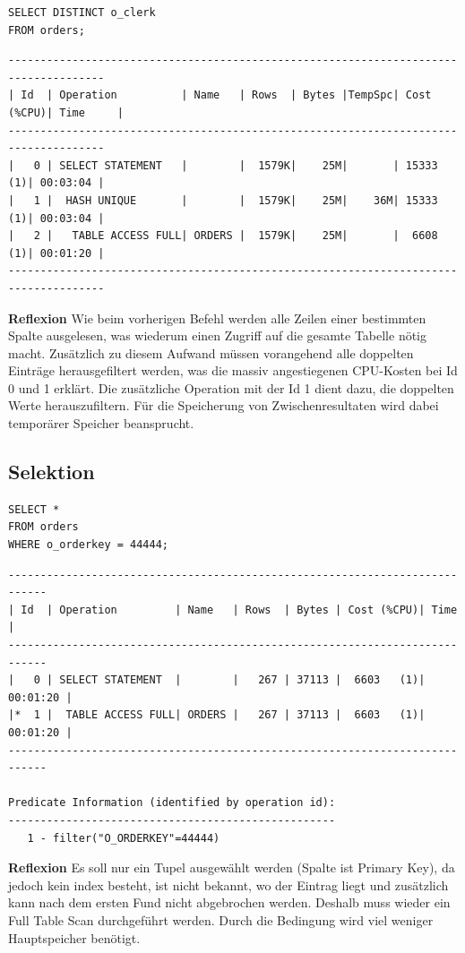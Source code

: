 \documentclass[10pt]{article}
\begin{document}
\begin{lstlisting}[style=sql]
SELECT DISTINCT o_clerk
FROM orders;
\end{lstlisting}
\begin{lstlisting}[style=queryexecutionplan]
-------------------------------------------------------------------------------------
| Id  | Operation          | Name   | Rows  | Bytes |TempSpc| Cost (%CPU)| Time     |
-------------------------------------------------------------------------------------
|   0 | SELECT STATEMENT   |        |  1579K|    25M|       | 15333   (1)| 00:03:04 |
|   1 |  HASH UNIQUE       |        |  1579K|    25M|    36M| 15333   (1)| 00:03:04 |
|   2 |   TABLE ACCESS FULL| ORDERS |  1579K|    25M|       |  6608   (1)| 00:01:20 |
-------------------------------------------------------------------------------------
\end{lstlisting} 
\textbf{Reflexion} \newline
Wie beim vorherigen Befehl werden alle Zeilen einer bestimmten Spalte ausgelesen,
was wiederum einen Zugriff auf die gesamte Tabelle nötig macht.
Zusätzlich zu diesem Aufwand müssen vorangehend alle doppelten Einträge herausgefiltert werden,
was die massiv angestiegenen CPU-Kosten bei Id 0 und 1 erklärt.
Die zusätzliche Operation mit der Id 1 dient dazu, die doppelten Werte herauszufiltern.
Für die Speicherung von Zwischenresultaten wird dabei temporärer Speicher beansprucht.

\subsection{Selektion}
\begin{lstlisting}[style=sql]
SELECT *
FROM orders
WHERE o_orderkey = 44444;
\end{lstlisting}
\begin{lstlisting}[style=queryexecutionplan]
----------------------------------------------------------------------------
| Id  | Operation         | Name   | Rows  | Bytes | Cost (%CPU)| Time     |
----------------------------------------------------------------------------
|   0 | SELECT STATEMENT  |        |   267 | 37113 |  6603   (1)| 00:01:20 |
|*  1 |  TABLE ACCESS FULL| ORDERS |   267 | 37113 |  6603   (1)| 00:01:20 |
----------------------------------------------------------------------------

Predicate Information (identified by operation id):
---------------------------------------------------
   1 - filter("O_ORDERKEY"=44444)
\end{lstlisting}
\textbf{Reflexion} \newline
Es soll nur ein Tupel ausgewählt werden (Spalte ist Primary Key), da jedoch 
kein index besteht, ist nicht bekannt, wo der Eintrag liegt und zusätzlich 
kann nach dem ersten Fund nicht abgebrochen werden. Deshalb muss wieder ein 
Full Table Scan durchgeführt werden. Durch die Bedingung wird viel weniger 
Hauptspeicher benötigt.
\end{document}
